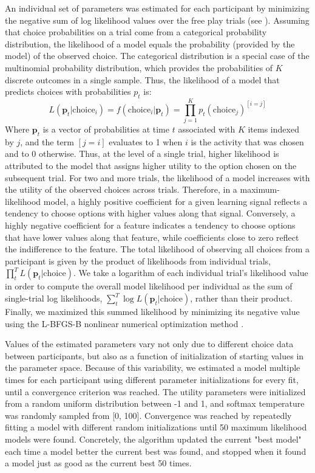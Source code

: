 An individual set of parameters was estimated  for each participant  by minimizing the negative sum of log likelihood values over the free play trials (see \parencite{daw2011trial}). Assuming that choice probabilities on a trial come from a categorical probability distribution, the likelihood of a model equals the probability (provided by the model) of the observed choice. The categorical distribution is a special case of the multinomial probability distribution, which provides the probabilities of $K$ discrete outcomes in a single sample. Thus, the likelihood of a model that predicts choices with probabilities $p_t$ is:
\begin{equation}\label{eq:likelihood}
    L(\textbf{p}_t \vert \text{choice}_i) = f(\text{choice}_i \vert \textbf{p}_t) = \prod_{j=1}^{K} p_t(\text{choice}_j)^{[i=j]}
\end{equation}
Where $\textbf{p}_t$ is a vector of probabilities at time $t$ associated with $K$ items indexed by $j$, and the term $[j = i]$ evaluates to 1 when $i$ is the activity that was chosen and to 0 otherwise. Thus, at the level of a single trial, higher likelihood is attributed to the model that assigns higher utility to the option chosen on the subsequent trial. For two and more trials, the likelihood of a model increases with the utility of the observed choices across trials. Therefore, in a maximum-likelihood model, a highly positive coefficient for a given learning signal reflects a tendency to choose options with higher values along that signal. Conversely, a highly negative coefficient for a feature indicates a tendency to choose options that have lower values along that feature, while coefficients close to zero reflect the indifference to the feature. The total likelihood of observing all choices from a participant is given by the product of likelihoods from individual trials, $\prod_t^T L(\textbf{p}_t \vert \text{choice})$. We take a logarithm of each individual trial's likelihood value in order to compute the overall model likelihood per individual as the sum of single-trial log likelihoods, $\sum_t^T \log L(\textbf{p}_t \vert \text{choice})$, rather than their product. Finally, we maximized this summed likelihood by minimizing its negative value using the L-BFGS-B nonlinear numerical optimization method \parencite{byrd1995limited}.
 
Values of the estimated parameters vary not only due to different choice data between participants, but also as a function of initialization of starting values in the parameter space. Because of this variability, we estimated a model multiple times for each participant using different parameter initializations for every fit, until a convergence criterion was reached. The utility parameters were initialized from a random uniform distribution between -1 and 1, and softmax temperature was randomly sampled from [0, 100]. Convergence was reached by repeatedly fitting a model with different random initializations until 50 maximum likelihood models were found. Concretely, the algorithm updated the current "best model" each time a model better the current best was found, and stopped when it found a model just as good as the current best 50 times.

